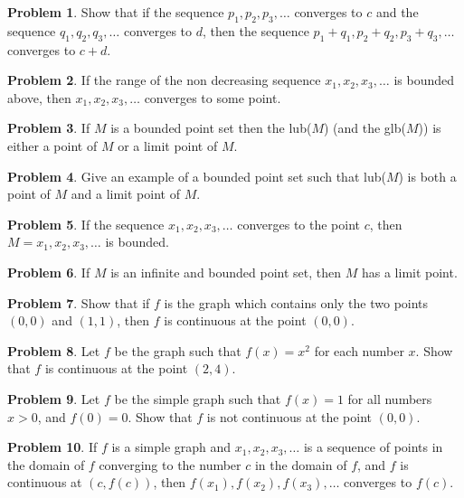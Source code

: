 \documentclass{article}
\theoremstyle{definition}
\newtheorem{problem}{Problem}
\begin{document}
\begin{problem}
Show that if the sequence $p_1, p_2, p_3, \dots$ converges to $c$ and the sequence $q_1, q_2, q_3, \dots$ converges to $d$, then the sequence $p_1 + q_1, p_2 + q_2, p_3 + q_3, \dots$ converges to $c + d$.
\end{problem}

\begin{problem}
If the range of the non decreasing sequence $x_1, x_2, x_3, \dots$ is bounded above, then $x_1, x_2, x_3, \dots$ converges to some point.
\end{problem}

\begin{problem}
If $M$ is a bounded point set then the lub($M$) (and the glb($M$)) is either a point of $M$ or a limit point of $M$.
\end{problem}

\begin{problem}
Give an example of a bounded point set such that lub($M$) is both a point of $M$ and a limit point of $M$.
\end{problem}

\begin{problem}
If the sequence $x_1, x_2, x_3,\dots$ converges to the point $c$, then $M = {x_1, x_2, x_3, \dots}$ is bounded.
\end{problem}

\begin{problem}
If $M$ is an infinite and bounded point set, then $M$ has a limit point.
\end{problem}

\begin{problem}
Show that if $f$ is the graph which contains only the two points $(0,0)$ and $(1,1)$, then $f$ is continuous at the point $(0,0)$.
\end{problem}

\begin{problem}
Let $f$ be the graph such that $f(x) = x^2$ for each number $x$. Show that $f$ is continuous at the point $(2, 4)$.
\end{problem}

\begin{problem}
Let $f$ be the simple graph such that $f(x) = 1$ for all numbers $x > 0$, and $f(0) = 0$. Show that $f$ is not continuous at the point $(0, 0)$.
\end{problem}

\begin{problem}
If $f$ is a simple graph and $x_1, x_2, x_3, \dots$ is a sequence of points in the domain of $f$ converging to the number $c$ in the domain of $f$, and $f$ is continuous at $(c, f(c))$, then $f(x_1), f(x_2), f(x_3), \dots$ converges to $f(c)$.
\end{problem}
\end{document}
